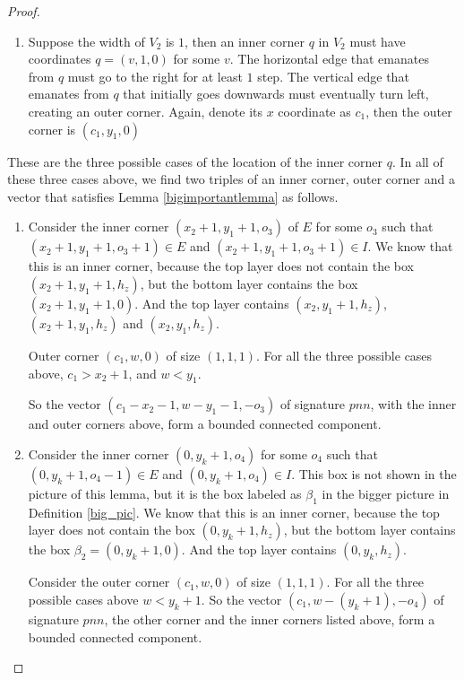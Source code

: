 \documentclass{amsart}[10pt]
\theoremstyle{plain}
\theoremstyle{definition}
\begin{document}
\begin{proof}
\begin{enumerate}
\item Suppose the width of $V_2$ is $1$, then an inner corner $q$ in $V_2$ must have coordinates $q=(v, 1, 0)$ for some $v$. The horizontal edge that emanates from $q$ must go to the right for at least $1$ step. The vertical edge that emanates from $q$ that initially goes downwards must eventually turn left, creating an outer corner. Again, denote its $x$ coordinate as $c_1$, then the outer corner is $(c_1, y_1,0)$
\end{enumerate}

These are the three possible cases of the location of the inner corner $q$. In all of these three cases above, we find two triples of an inner corner, outer corner and a vector that satisfies Lemma \ref{bigimportantlemma} as follows.

\begin{enumerate}
\item Consider the inner corner $(x_2+1, y_1+1,o_3)$ of $E$ for some $o_3$ such that $(x_2+1, y_1+1,o_3+1) \in E$ and $(x_2+1, y_1+1,o_3+1) \in I$. We know that this is an inner corner, because the top layer does not contain the box $(x_2+1, y_1+1, h_z)$, but the bottom layer contains the box $(x_2+1, y_1+1, 0)$. And the top layer contains $(x_2, y_1+1, h_z)$, $(x_2+1, y_1, h_z)$ and $(x_2, y_1, h_z)$.

Outer corner $(c_1, w, 0)$ of size $(1,1,1)$. For all the three possible cases above, $c_1 > x_2+1$, and $w < y_1$.  

So the vector $(c_1-x_2-1,w-y_1-1, -o_3)$ of signature $pnn$, with the inner and outer corners above, form a bounded connected component.

\item Consider the inner corner $(0, y_k+1, o_4)$ for some $o_4$ such that $(0, y_k+1, o_4-1) \in E$ and $(0, y_k+1, o_4) \in I$. This box is not shown in the picture of this lemma, but it is the box labeled as $\beta_1$ in the bigger picture in Definition \ref{big_pic}. We know that this is an inner corner, because the top layer does not contain the box $(0, y_k+1, h_z)$, but the bottom layer contains the box $\beta_2=(0, y_k+1, 0)$. And the top layer contains $(0, y_k, h_z)$.

Consider the outer corner $(c_1, w, 0)$ of size $(1,1,1)$. For all the three possible cases above $w < y_k+1$. So the vector $(c_1, w-(y_k+1), -o_4)$ of signature $pnn$, the other corner and the inner corners listed above, form a bounded connected component.
\end{enumerate}

\end{proof}
\end{document}
